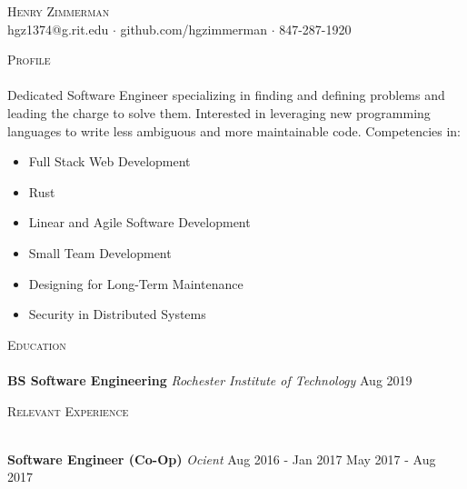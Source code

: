 \documentclass[a4paper]{article}
\newcommand{\lineunder} {
    \vspace*{-8pt} \\
    \hspace*{-18pt} \hrulefill \\
}
\newcommand{\header} [1] {
    {\hspace*{-18pt}\vspace*{6pt} \textsc{#1}}
    \vspace*{-6pt} \lineunder
}
\begin{document}
\vspace*{-40pt}

    

\vspace*{-10pt}
\begin{center}
	{\Huge \scshape {Henry Zimmerman}}\\
	hgz1374@g.rit.edu $\cdot$ github.com/hgzimmerman $\cdot$ 847-287-1920 \\
\end{center}



\header{Profile}
Dedicated Software Engineer specializing in finding and defining problems and leading the charge to solve them.
Interested in leveraging new programming languages to write less ambiguous and more maintainable code.
Competencies in:

\begin{multicols}{2}
\begin{itemize} \itemsep -1mm
    \item Full Stack Web Development
    \item Rust
    \item Linear and Agile Software Development
    \item Small Team Development
    \item Designing for Long-Term Maintenance
    \item Security in Distributed Systems
\end{itemize}
\end{multicols}

\header{Education}
    \textbf{BS Software Engineering} \textit{Rochester Institute of Technology}  \hfill  Aug 2019\\
\vspace{2mm}

\header{Relevant Experience}
\vspace{1mm}

 
\textbf{Software Engineer (Co-Op)} \textit{Ocient} \hfill Aug 2016 - Jan 2017 \textbar{} May 2017 - Aug 2017\\
\end{document}

